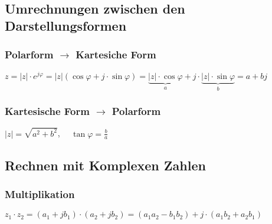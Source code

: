 			\begin{flushleft}
				\\
				\\
			\end{flushleft}
			
		\vspace{10mm}
		\subsection{Umrechnungen zwischen den Darstellungsformen}
			
			\vspace{10mm}
			\subsubsection*{Polarform \(\rightarrow\) Kartesiche Form}
			
			
				\( z = \left| z \right| \cdot e^{j \varphi} = \left| z \right| \left( \cos \varphi + j \cdot \sin \varphi \right) = 
				\underbrace{\left| z \right| \cdot \cos \varphi}_{a} + j \cdot \underbrace{\left| z \right| \cdot \sin \varphi}_{b} = a + bj \)	
			
			\vspace{10mm}
			\subsubsection*{Kartesische Form \(\rightarrow\) Polarform}
			
			
				\( \left| z \right| = \sqrt{a^2 + b^2}\), \ \ \(\tan \varphi = \frac{b}{a} \)
				
		\vspace{10mm}
		\subsection{Rechnen mit Komplexen Zahlen}
			\vspace{10mm}
			\subsubsection*{Multiplikation}
															
								
				\begin{center}
				\(z_1 \cdot z_2 = \left( a_1 + j b_1 \right) \cdot \left( a_2 + j b_2 \right) 
												= \left( a_1 a_2 - b_1 b_2 \right) + j \cdot \left( a_1 b_2 + a_2 b_1 \right)\)
				\end{center}
								
